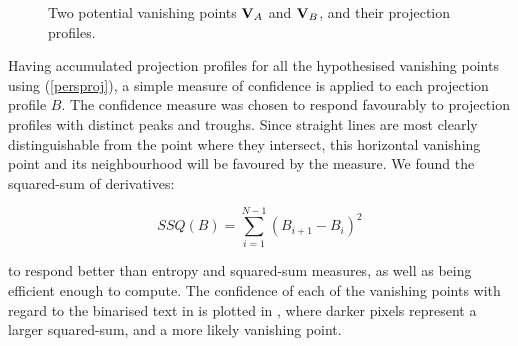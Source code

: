 \begin{figure}[t]
\centering
\begin{center}
\end{center}
\vspace*{-6mm}
\caption{Two potential vanishing points ${ \bf V }_A$ and ${ \bf V }_B$, and their
projection profiles.}
\label{projprofs}
\end{figure}

Having accumulated projection profiles for all the hypothesised vanishing points
using (\ref{persproj}), a simple measure of confidence is
applied to each projection profile $B$.
The confidence measure was chosen to respond favourably to projection profiles
with distinct peaks and troughs.
Since straight lines are most clearly distinguishable from the point where they intersect,
this horizontal vanishing point and its neighbourhood will be favoured by the measure.
We found the squared-sum of derivatives:

\begin{equation}
SSQ(B) = \sum_{i=1}^{N-1}{(B_{i+1}-B_{i})^{2}}
\end{equation}

{ \parindent 0mm
to respond better than entropy and squared-sum measures,
as well as being efficient enough to compute.
The confidence of each of the vanishing points with regard to the binarised text in 
is plotted in ,
where darker pixels represent a larger squared-sum, and a more likely
vanishing point.
}

